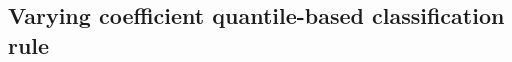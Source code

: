












\subsection{Varying coefficient quantile-based classification rule}
\label{sec:varying-coefficient}

